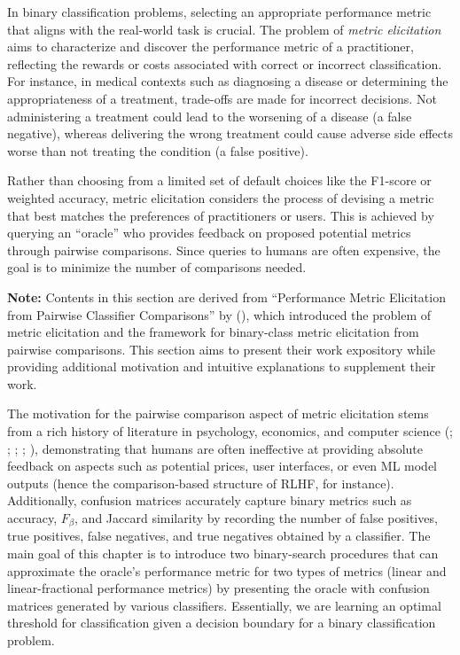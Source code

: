 \documentclass[
  letterpaper,
  numbers=noenddot,
  DIV=11]{scrreprt}
\theoremstyle{definition}
\theoremstyle{plain}
\theoremstyle{plain}
\theoremstyle{remark}
\begin{document}
In binary classification problems, selecting an appropriate performance
metric that aligns with the real-world task is crucial. The problem of
\emph{metric elicitation} aims to characterize and discover the
performance metric of a practitioner, reflecting the rewards or costs
associated with correct or incorrect classification. For instance, in
medical contexts such as diagnosing a disease or determining the
appropriateness of a treatment, trade-offs are made for incorrect
decisions. Not administering a treatment could lead to the worsening of
a disease (a false negative), whereas delivering the wrong treatment
could cause adverse side effects worse than not treating the condition
(a false positive).

Rather than choosing from a limited set of default choices like the
F1-score or weighted accuracy, metric elicitation considers the process
of devising a metric that best matches the preferences of practitioners
or users. This is achieved by querying an ``oracle'' who provides
feedback on proposed potential metrics through pairwise comparisons.
Since queries to humans are often expensive, the goal is to minimize the
number of comparisons needed.

\textbf{Note:} Contents in this section are derived from ``Performance
Metric Elicitation from Pairwise Classifier Comparisons'' by
(),
which introduced the problem of metric elicitation and the framework for
binary-class metric elicitation from pairwise comparisons. This section
aims to present their work expository while providing additional
motivation and intuitive explanations to supplement their work.

The motivation for the pairwise comparison aspect of metric elicitation
stems from a rich history of literature in psychology, economics, and
computer science (;
; ; ;
), demonstrating that
humans are often ineffective at providing absolute feedback on aspects
such as potential prices, user interfaces, or even ML model outputs
(hence the comparison-based structure of RLHF, for instance).
Additionally, confusion matrices accurately capture binary metrics such
as accuracy, \(F_\beta\), and Jaccard similarity by recording the number
of false positives, true positives, false negatives, and true negatives
obtained by a classifier. The main goal of this chapter is to introduce
two binary-search procedures that can approximate the oracle's
performance metric for two types of metrics (linear and
linear-fractional performance metrics) by presenting the oracle with
confusion matrices generated by various classifiers. Essentially, we are
learning an optimal threshold for classification given a decision
boundary for a binary classification problem.
\end{document}

